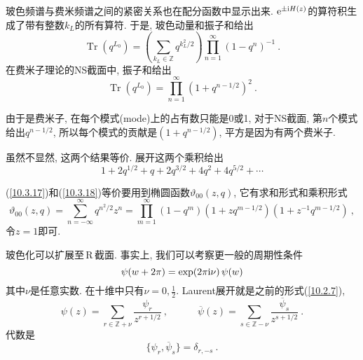 玻色频谱与费米频谱之间的紧密关系也在配分函数中显示出来. $\mathrm{e}^{\pm\mathrm{i} H(z)}$的算符积生成了带有整数$k_{L}$的所有算符. 于是, 玻色动量和振子和给出
\begin{equation}
    \operatorname{Tr}(q^{L_{0}})=\left(\sum_{k_{L}\in\mathds{Z}}q^{k_{L}^{2}/2}\right)
    \prod_{n=1}^{\infty} (1-q^{n})^{-1}\:. \label{10.3.17}
\end{equation}
在费米子理论的NS截面中, 振子和给出
\begin{equation}
    \operatorname{Tr}(q^{L_{0}})=\prod_{n=1}^{\infty}(1+q^{n-1/2})^{2}\:. \label{10.3.18}
\end{equation}
\begin{tcolorbox}
由于是费米子, 在每个模式(mode)上的占有数只能是0或1, 对于NS截面, 第$ n $个模式给出$q^{n-1/2}$, 所以每个模式的贡献是$(1+q^{n-1/2})$, 平方是因为有两个费米子.
\end{tcolorbox}
虽然不显然, 这两个结果等价. 展开这两个乘积给出
\begin{equation}
    1+2q^{1/2}+q+2q^{3/2}+4q^{2}+4q^{5/2} +\cdots \label{10.3.19}
\end{equation}
\begin{tcolorbox}
(\ref{10.3.17})和(\ref{10.3.18})等价要用到椭圆函数$\vartheta_{00}(z,q)$, 它有求和形式和乘积形式
\begin{equation*}
    \vartheta_{00}(z,q)=\sum_{n=-\infty}^{\infty}q^{n^{2}/2}z^{n} 
    =\prod_{m=1}^{\infty}(1-q^{m})(1+z q^{m-1/2})(1+z^{-1}q^{m-1/2})\:, 
\end{equation*}
令$z=1$即可.
\end{tcolorbox}

玻色化可以扩展至\,R\,截面. 事实上, 我们可以考察更一般的周期性条件
\begin{equation}
    \psi(w+2\pi) = \exp (2\pi\mathrm{i}\nu) \,\psi(w) \label{10.3.20}
\end{equation}
其中$ \nu $是任意实数. 在十维中只有$ \nu=0,\frac{1}{2}$. Laurent展开就是之前的形式(\ref{10.2.7}),
\begin{equation}
    \psi(z)=\sum_{r\in \mathds{Z}+\nu}\frac{\psi_{r}}{z^{r+1/2}} \:, \qquad\quad 
    \overline{\psi}(z)=\sum_{s\in\mathds{Z}-\nu}\frac{\overline{\psi}_{s}}{z^{s+1/2}}\:.
\end{equation}
代数是
\begin{equation}
    \{\psi_{r},\overline{\psi}_{s}\} =\delta_{r,-s} \:. \label{10.3.22}
\end{equation}

